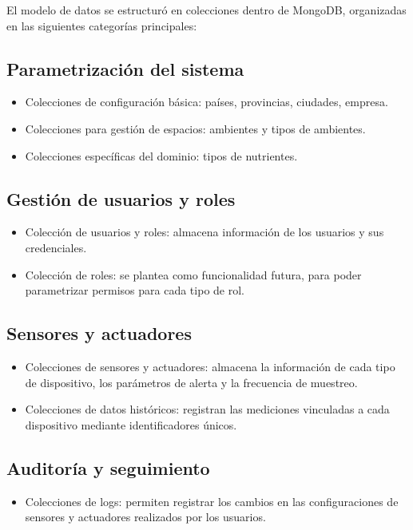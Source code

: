 El modelo de datos se estructuró en colecciones dentro de MongoDB, organizadas
en las siguientes categorías principales:

\subsection{Parametrización del sistema}

\begin{itemize}
    \item Colecciones de configuración básica: países, provincias, ciudades, empresa.
    \item Colecciones para gestión de espacios: ambientes y tipos de ambientes.
    \item Colecciones específicas del dominio: tipos de nutrientes.
\end{itemize}

\subsection{Gestión de usuarios y roles}

\begin{itemize}
    \item Colección de usuarios y roles: almacena información de los usuarios y sus
          credenciales.
    \item Colección de roles: se plantea como funcionalidad futura, para poder
          parametrizar permisos para cada tipo de rol.
\end{itemize}

\subsection{Sensores y actuadores}
\begin{itemize}
    \item Colecciones de sensores y actuadores: almacena la información de cada tipo de
          dispositivo, los parámetros de alerta y la frecuencia de muestreo.
    \item Colecciones de datos históricos: registran las mediciones vinculadas a cada
          dispositivo mediante identificadores únicos.
\end{itemize}

\subsection{Auditoría y seguimiento}
\begin{itemize}
    \item Colecciones de logs: permiten registrar los cambios en las configuraciones de
          sensores y actuadores realizados por los usuarios.
\end{itemize}


